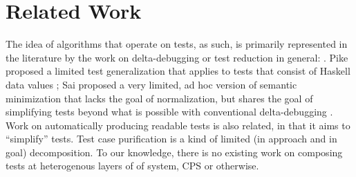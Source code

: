 \section{Related Work}

The idea of algorithms that operate on tests, as such, is
primarily represented in the literature by the work on
delta-debugging or test reduction in general:
\cite{DD,HDD,TCminim,MinUnit,CReduce,Lithium,ZellerBook,DDISSTA,IsolThread,Yesterday}.  Pike proposed a limited test
generalization that applies to tests that consist of Haskell data
values \cite{SmartCheck}; Sai proposed a very limited, ad hoc
version of semantic minimization that lacks the goal of normalization,
but shares the goal of simplifying tests beyond what is possible with
conventional delta-debugging \cite{SaiSimple}.  Work on automatically producing readable tests \cite{Guava,Readable} is also
related, in that it aims to ``simplify'' tests.  Test case
purification \cite{PureTest} is a kind of limited (in approach and in
goal) decomposition.  To our knowledge, there is no existing work on composing tests at heterogenous layers of of system, CPS or otherwise.
